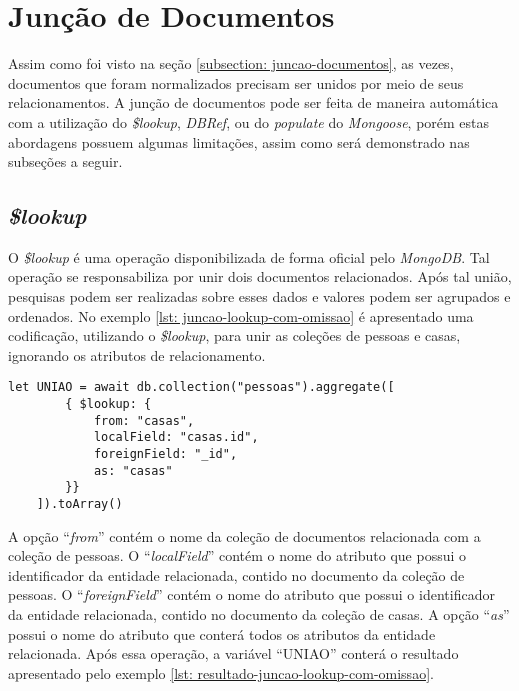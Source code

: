 \section{Junção de Documentos\label{section: juncao-documentos}}

Assim como foi visto na seção \ref{subsection: juncao-documentos}, as vezes, documentos que foram normalizados precisam ser unidos por meio de seus relacionamentos. A junção de documentos pode ser feita de maneira automática com a utilização do \textit{\$lookup}, \textit{DBRef}, ou do \textit{populate} do \textit{Mongoose}, porém estas abordagens possuem algumas limitações, assim como será demonstrado nas subseções a seguir.

\subsection{\textit{\$lookup}}

O \textit{\$lookup} é uma operação disponibilizada de forma oficial pelo \textit{MongoDB}. Tal operação se responsabiliza por unir dois documentos relacionados. Após tal união, pesquisas podem ser realizadas sobre esses dados e valores podem ser agrupados e ordenados. No exemplo \ref{lst: juncao-lookup-com-omissao} é apresentado uma codificação, utilizando o \textit{\$lookup}, para unir as coleções de pessoas e casas, ignorando os atributos de relacionamento.

\newpage

\begin{lstlisting}[style=ES6, caption={Junção de Documentos com Omissão\label{lst: juncao-lookup-com-omissao}}]
    let UNIAO = await db.collection("pessoas").aggregate([
        { $lookup: {
            from: "casas",
            localField: "casas.id",
            foreignField: "_id",
            as: "casas"
        }}
    ]).toArray()
\end{lstlisting}

A opção ``\textit{from}'' contém o nome da coleção de documentos relacionada com a coleção de pessoas. O ``\textit{localField}'' contém o nome do atributo que possui o identificador da entidade relacionada, contido no documento da coleção de pessoas. O ``\textit{foreignField}'' contém o nome do atributo que possui o identificador da entidade relacionada, contido no documento da coleção de casas. A opção ``\textit{as}'' possui o nome do atributo que conterá todos os atributos da entidade relacionada. Após essa operação, a  variável ``UNIAO'' conterá o resultado apresentado pelo exemplo \ref{lst: resultado-juncao-lookup-com-omissao}.

